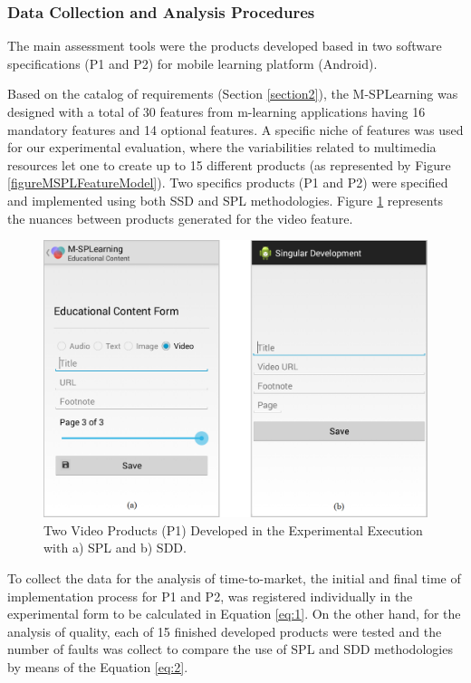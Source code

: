 \subsubsection{Data Collection and Analysis Procedures}

The main assessment tools were the products developed based in two software specifications (P1 and P2) for mobile learning platform (Android).

Based on the catalog of requirements (Section \ref{section2}), the M-SPLearning was designed with a total of 30 features from m-learning applications having 16 mandatory features and 14 optional features. A specific niche of features was used for our experimental evaluation, where the variabilities related to multimedia resources let one to create up to 15 different products (as represented by Figure \ref{figureMSPLFeatureModel}). Two specifics products (P1 and P2) were specified and implemented using both SSD and SPL methodologies. Figure \ref{fig:prod} represents the nuances between products generated for the video feature.


\begin{figure}[t]
\centering
\includegraphics[scale=0.275]{figures/section4/prod.png}
\centering
\caption{Two Video Products (P1) Developed in the Experimental Execution with a) SPL and b) SDD.}
\label{fig:prod}
\end{figure}


To collect the data for the analysis of time-to-market, the initial and final time of implementation process for P1 and P2, was registered individually in the experimental form to be calculated in Equation \ref{eq:1}. On the other hand, for the analysis of quality, each of 15 finished developed products were tested and the number of faults was collect to compare the use of SPL and SDD methodologies by means of the Equation \ref{eq:2}.

